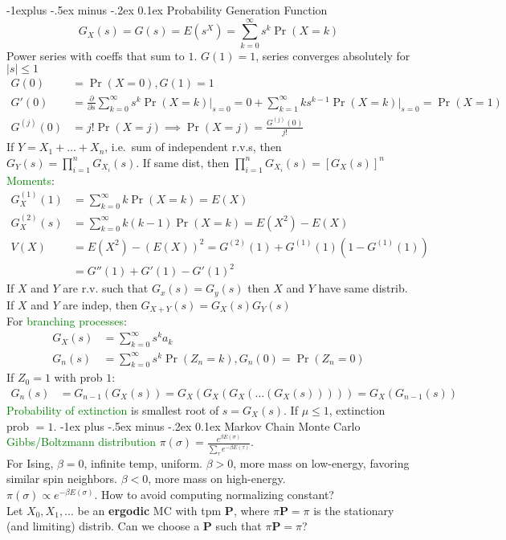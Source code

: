 \documentclass[landscape]{article}
\makeatletter
\renewcommand{\section}{\@startsection{section}{1}{0mm}%
                                {-1ex plus -.5ex minus -.2ex}%
                                {0.1ex}%
                                {\color{blue}\normalfont\large\bfseries}}
\renewcommand{\subsection}{\@startsection{subsection}{2}{0mm}%
                                {-1explus -.5ex minus -.2ex}%
                                {0.1ex}%
                                {\color{orange}\normalfont\normalsize\bfseries}}
\makeatother
\begin{document}
\begin{multicols*}{3}
\subsection{Probability Generation Function}
$$G_X(s) = G(s) = E(s^X) = \sum_{k=0}^{\infty} s^k \Pr(X = k)$$
Power series with coeffs that sum to $1$. $G(1) = 1$, series converges
absolutely for $\left|s\right| \leq 1$
\begin{align*}
  G(0) & = \Pr(X = 0)
  , G(1) = 1
  \\ G'(0) & = \frac{\partial{}}{\partial{s}} \sum_{k = 0}^{\infty}s^k \Pr(X = k) \bigg\lvert_{s = 0} = 0 + \sum_{k = 1}^{\infty}ks^{k-1} \Pr(X = k) \bigg\lvert_{s = 0}
  = \Pr(X = 1)
  \\ G^{(j)}(0) & = j! \Pr(X = j) \implies \Pr(X = j) = \frac{G^{(j)}(0)}{j!}
\end{align*}
If $Y = X_1 + \ldots + X_n$, i.e.\ sum of independent r.v.s, then
$G_Y(s) = \prod_{i=1}^{n} G_{X_i}(s)$. If same dist, then
$\prod_{i=1}^{n} G_{X_i}(s) = [G_X(s)]^n$ \\
\textcolor{green}{Moments}:
\begin{align*}
  G_X^{(1)}(1) & = \sum_{k=0}^{\infty}k \Pr(X = k) = E(X)
  \\ G_X^{(2)}(s) & = \sum_{k=0}^{\infty}k(k-1)\Pr(X = k) = E(X^2) - E(X)
  \\ V(X) & = E(X^2) - (E(X))^2 = G^{(2)}(1) + G^{(1)}(1) (1 - G^{(1)}(1))
  \\ & = G''(1) + G'(1) - G'(1)^2
\end{align*}
If $X$ and $Y$ are r.v. such that $G_x(s) = G_y(s)$ then $X$ and $Y$
have same distrib.  \\ If $X$ and $Y$ are indep, then
$G_{X+Y}(s) = G_X(s)G_Y(s)$ \\ For \textcolor{green}{branching
  processes}:
\begin{align*}
  G_X(s) & = \sum_{k=0}^{\infty}s^k a_k
  \\ G_n(s) & = \sum_{k=0}^{\infty}s^k \Pr(Z_n = k), G_n(0) = \Pr(Z_n = 0)
\end{align*}
If $Z_0 = 1$ with prob $1$:
\begin{align*}
  G_n(s) & = G_{n-1}(G_X(s)) =  G_X(G_X(G_X (\ldots (G_X(s))))) = G_X(G_{n-1}(s))
\end{align*}
\textcolor{green}{Probability of extinction} is smallest root of
$s = G_X(s)$. If $\mu \leq 1$, extinction prob $ = 1$.
\section{Markov Chain Monte Carlo}
\textcolor{green}{Gibbs/Boltzmann distribution}
$\pi(\sigma) = \frac{e^{\beta E(\sigma)}}{\sum_{\tau}e^{-\beta
    E(\tau)}}$.
\\ For Ising, $\beta = 0$, infinite temp, uniform. $\beta > 0$, more
mass on low-energy, favoring similar spin neighbors. $\beta < 0$, more
mass on high-energy.
\\ $\pi(\sigma) \propto e^{-\beta E(\sigma)}$. How to
avoid computing normalizing constant?  \\ Let $X_0, X_1, \ldots$ be an
\textbf{ergodic} MC with tpm $\mathbf{P}$, where
$\pi \mathbf{P} = \pi$ is the stationary (and limiting) distrib. Can
we choose a $\mathbf{P}$ such that $\pi \mathbf{P} = \pi$?

\end{multicols*}
\end{document}
